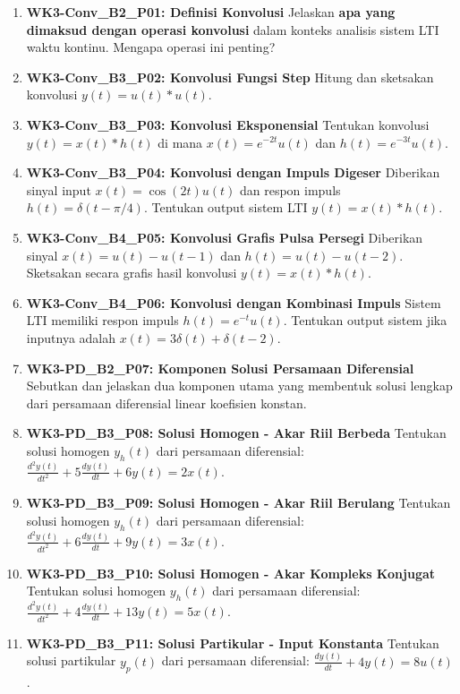 \documentclass[
  letterpaper,
  DIV=11,
  numbers=noendperiod]{scrreprt}
\begin{document}
\begin{enumerate}
\def\labelenumi{\arabic{enumi}.}
\item
  \textbf{WK3-Conv\_B2\_P01: Definisi Konvolusi} Jelaskan \textbf{apa
  yang dimaksud dengan operasi konvolusi} dalam konteks analisis sistem
  LTI waktu kontinu. Mengapa operasi ini penting?
\item
  \textbf{WK3-Conv\_B3\_P02: Konvolusi Fungsi Step} Hitung dan sketsakan
  konvolusi \(y(t) = u(t) * u(t)\).
\item
  \textbf{WK3-Conv\_B3\_P03: Konvolusi Eksponensial} Tentukan konvolusi
  \(y(t) = x(t) * h(t)\) di mana \(x(t) = e^{-2t}u(t)\) dan
  \(h(t) = e^{-3t}u(t)\).
\item
  \textbf{WK3-Conv\_B3\_P04: Konvolusi dengan Impuls Digeser} Diberikan
  sinyal input \(x(t) = \cos(2t)u(t)\) dan respon impuls
  \(h(t) = \delta(t- \pi/4)\). Tentukan output sistem LTI
  \(y(t) = x(t) * h(t)\).
\item
  \textbf{WK3-Conv\_B4\_P05: Konvolusi Grafis Pulsa Persegi} Diberikan
  sinyal \(x(t) = u(t) - u(t-1)\) dan \(h(t) = u(t) - u(t-2)\).
  Sketsakan secara grafis hasil konvolusi \(y(t) = x(t) * h(t)\).
\item
  \textbf{WK3-Conv\_B4\_P06: Konvolusi dengan Kombinasi Impuls} Sistem
  LTI memiliki respon impuls \(h(t) = e^{-t}u(t)\). Tentukan output
  sistem jika inputnya adalah \(x(t) = 3\delta(t) + \delta(t-2)\).
\item
  \textbf{WK3-PD\_B2\_P07: Komponen Solusi Persamaan Diferensial}
  Sebutkan dan jelaskan dua komponen utama yang membentuk solusi lengkap
  dari persamaan diferensial linear koefisien konstan.
\item
  \textbf{WK3-PD\_B3\_P08: Solusi Homogen - Akar Riil Berbeda} Tentukan
  solusi homogen \(y_h(t)\) dari persamaan diferensial:
  \(\frac{d^2 y(t)}{dt^2} + 5 \frac{dy(t)}{dt} + 6 y(t) = 2x(t)\).
\item
  \textbf{WK3-PD\_B3\_P09: Solusi Homogen - Akar Riil Berulang} Tentukan
  solusi homogen \(y_h(t)\) dari persamaan diferensial:
  \(\frac{d^2 y(t)}{dt^2} + 6 \frac{dy(t)}{dt} + 9 y(t) = 3x(t)\).
\item
  \textbf{WK3-PD\_B3\_P10: Solusi Homogen - Akar Kompleks Konjugat}
  Tentukan solusi homogen \(y_h(t)\) dari persamaan diferensial:
  \(\frac{d^2 y(t)}{dt^2} + 4 \frac{dy(t)}{dt} + 13 y(t) = 5x(t)\).
\item
  \textbf{WK3-PD\_B3\_P11: Solusi Partikular - Input Konstanta} Tentukan
  solusi partikular \(y_p(t)\) dari persamaan diferensial:
  \(\frac{dy(t)}{dt} + 4y(t) = 8u(t)\).

\end{enumerate}
\end{document}
